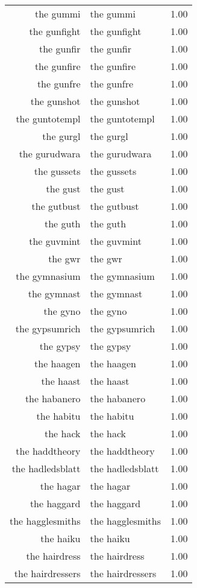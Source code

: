 \begin{table}[ht]
\begin{tabular}{rlr}
  the gummi & the gummi & 1.00 \\ 
  the gunfight & the gunfight & 1.00 \\ 
  the gunfir & the gunfir & 1.00 \\ 
  the gunfire & the gunfire & 1.00 \\ 
  the gunfre & the gunfre & 1.00 \\ 
  the gunshot & the gunshot & 1.00 \\ 
  the guntotempl & the guntotempl & 1.00 \\ 
  the gurgl & the gurgl & 1.00 \\ 
  the gurudwara & the gurudwara & 1.00 \\ 
  the gussets & the gussets & 1.00 \\ 
  the gust & the gust & 1.00 \\ 
  the gutbust & the gutbust & 1.00 \\ 
  the guth & the guth & 1.00 \\ 
  the guvmint & the guvmint & 1.00 \\ 
  the gwr & the gwr & 1.00 \\ 
  the gymnasium & the gymnasium & 1.00 \\ 
  the gymnast & the gymnast & 1.00 \\ 
  the gyno & the gyno & 1.00 \\ 
  the gypsumrich & the gypsumrich & 1.00 \\ 
  the gypsy & the gypsy & 1.00 \\ 
  the haagen & the haagen & 1.00 \\ 
  the haast & the haast & 1.00 \\ 
  the habanero & the habanero & 1.00 \\ 
  the habitu & the habitu & 1.00 \\ 
  the hack & the hack & 1.00 \\ 
  the haddtheory & the haddtheory & 1.00 \\ 
  the hadledsblatt & the hadledsblatt & 1.00 \\ 
  the hagar & the hagar & 1.00 \\ 
  the haggard & the haggard & 1.00 \\ 
  the hagglesmiths & the hagglesmiths & 1.00 \\ 
  the haiku & the haiku & 1.00 \\ 
  the hairdress & the hairdress & 1.00 \\ 
  the hairdressers & the hairdressers & 1.00 \\ 

\end{tabular}
\end{table}
